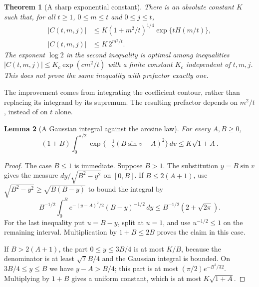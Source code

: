 \documentclass[11pt,a4paper]{article}
\newtheorem{theorem}{Theorem}[section]
\newtheorem{lemma}[theorem]{Lemma}
\theoremstyle{definition}
\theoremstyle{remark}
\numberwithin{equation}{section}
\begin{document}
\begin{theorem}[A sharp exponential constant]\label{p8:cbx:main}
There is an absolute constant $K$ such that, for all
$t\ge1$, $0\le m\le t$ and $0\le j\le t$,
\begin{align}
 |C(t,m,j)|&\le K(1+m^2/t)^{1/4}\exp\{tH(m/t)\},
                                      \label{p8:cbx:profileupper}\\
 |C(t,m,j)|&\le K\,2^{m^2/t}.           \label{p8:cbx:optimalupper}
\end{align}
The exponent $\log2$ in the second inequality is optimal among
inequalities $|C(t,m,j)|\le K_c\exp(c m^2/t)$ with a finite constant
$K_c$ independent of $t,m,j$. This does not prove the same inequality
with prefactor exactly one.
\end{theorem}

The improvement comes from integrating the coefficient contour,
rather than replacing its integrand by its supremum. The resulting
prefactor depends on $m^2/t$, instead of on $t$ alone.

\begin{lemma}[A Gaussian integral against the arcsine law]
\label{p8:cbx:arcsine}
For every $A,B\ge0$,
\[
 (1+B)\int_0^{\pi/2}
       \exp\{-\tfrac12(B\sin v-A)^2\}\,dv
       \le K\sqrt{1+A}.
\]
\end{lemma}
\begin{proof}
The case $B\le1$ is immediate. Suppose $B>1$. The substitution
$y=B\sin v$ gives the measure $dy/\sqrt{B^2-y^2}$ on $[0,B]$.
If $B\le2(A+1)$, use
$\sqrt{B^2-y^2}\ge\sqrt{B(B-y)}$ to bound the integral by
\[
 B^{-1/2}\int_0^B e^{-(y-A)^2/2}(B-y)^{-1/2}\,dy
 \le B^{-1/2}(2+\sqrt{2\pi}).
\]
For the last inequality put $u=B-y$, split at $u=1$, and use
$u^{-1/2}\le1$ on the remaining interval. Multiplication by
$1+B\le2B$ proves the claim in this case.

If $B>2(A+1)$, the part $0\le y\le3B/4$ is at most $K/B$,
because the denominator is at least $\sqrt7 B/4$ and the Gaussian
integral is bounded. On $3B/4\le y\le B$ we have $y-A>B/4$;
this part is at most $(\pi/2)e^{-B^2/32}$. Multiplying by
$1+B$ gives a uniform constant, which is at most
$K\sqrt{1+A}$.
\end{proof}
\end{document}
